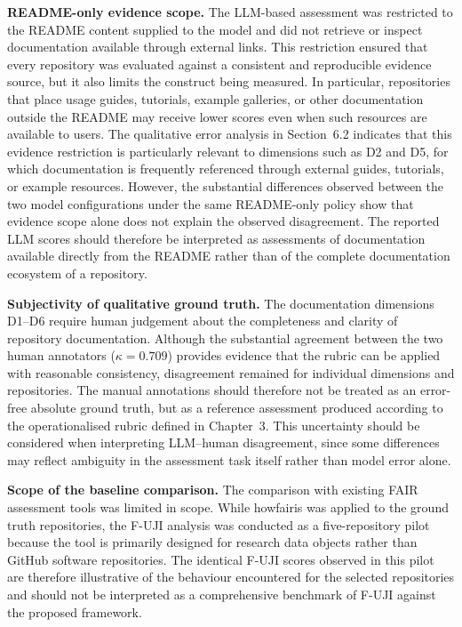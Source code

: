 \textbf{README-only evidence scope.} The LLM-based assessment was
restricted to the README content supplied to the model and did not
retrieve or inspect documentation available through external links.
This restriction ensured that every repository was evaluated against
a consistent and reproducible evidence source, but it also limits the
construct being measured. In particular, repositories that place
usage guides, tutorials, example galleries, or other documentation
outside the README may receive lower scores even when such resources
are available to users.
The qualitative error analysis in Section~6.2 indicates that this
evidence restriction is particularly relevant to dimensions such as
D2 and D5, for which documentation is frequently referenced through
external guides, tutorials, or example resources. However, the
substantial differences observed between the two model configurations
under the same README-only policy show that evidence scope alone does
not explain the observed disagreement. The reported LLM scores should
therefore be interpreted as assessments of documentation available
directly from the README rather than of the complete documentation
ecosystem of a repository.

\textbf{Subjectivity of qualitative ground truth.} The documentation
dimensions D1--D6 require human judgement about the completeness and
clarity of repository documentation. Although the substantial
agreement between the two human annotators
($\kappa=0.709$) provides evidence that the rubric can be applied
with reasonable consistency, disagreement remained for individual
dimensions and repositories. The manual annotations should therefore
not be treated as an error-free absolute ground truth, but as a
reference assessment produced according to the operationalised rubric
defined in Chapter~3. This uncertainty should be considered when
interpreting LLM--human disagreement, since some differences may
reflect ambiguity in the assessment task itself rather than model
error alone.

\textbf{Scope of the baseline comparison.} The comparison with
existing FAIR assessment tools was limited in scope. While howfairis
was applied to the ground truth repositories, the F-UJI analysis was
conducted as a five-repository pilot because the tool is primarily
designed for research data objects rather than GitHub software
repositories. The identical F-UJI scores observed in this pilot are
therefore illustrative of the behaviour encountered for the selected
repositories and should not be interpreted as a comprehensive
benchmark of F-UJI against the proposed framework.

